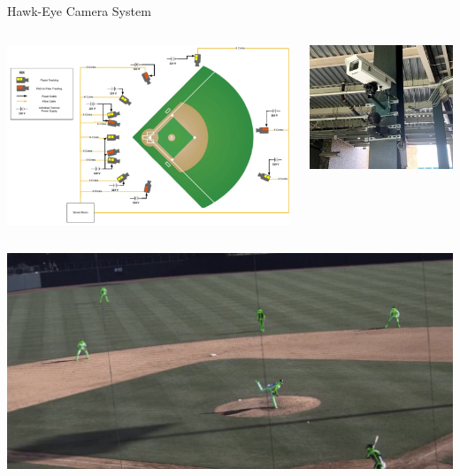 \documentclass[handout]{beamer}
\begin{document}
\begin{frame}{Hawk-Eye Camera System}
  \begin{columns}
    \begin{column}{0.6\textwidth}
      \includegraphics[width = \textwidth]{images/camera_system.png}
    \end{column}
    \begin{column}{0.4\textwidth}
      \includegraphics[width = \textwidth]{images/hawkeye_camera.jpeg}
    \end{column}
  \end{columns}
  \pause
  \begin{columns}
    \begin{column}{0.6\textwidth}
      \includegraphics[width = \textwidth]{images/pose_tracking.png}

\end{column}
\end{columns}
\end{frame}
\end{document}
